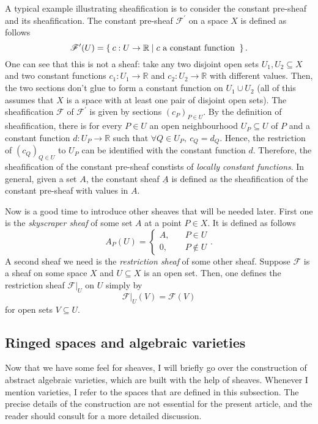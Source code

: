 A typical example illustrating sheafification is to consider the constant
pre-sheaf and its sheafification. The constant pre-sheaf
$\mathscr{F}^{\prime}$ on a space $X$ is defined as follows
\[
  \mathscr{F}^{\prime}(U) =\Set{c: U\to\mathbb{R}\mid c
    \text{ a constant function }}.
\]
One can see that this is not a sheaf: take any two disjoint open sets
$U_{1}, U_{2}\subseteq X$ and two constant functions $c_{1}:U_{1}\to
\mathbb{R}$ and $c_{2}:U_{2}\to\mathbb{R}$ with different values.
Then, the two sections don't glue to form a constant function on
$U_{1}\cup U_{2}$ (all of this assumes that $X$ is a space with
at least one pair of disjoint open sets). The sheafification $\mathscr{F}$ of
$\mathscr{F}^{\prime}$ is given by sections $(c_{P})_{P\in U}$. By the
definition of sheafification, there is for every $P\in U$ an open
neighbourhood $U_{P}\subseteq U$ of $P$ and a constant function
$d: U_{P}\to\mathbb{R}$ such that $\forall Q\in U_{P},\ c_{Q}=d_{Q}$.
Hence, the restriction of $(c_{Q})_{Q\in U}$ to $U_{P}$ can be identified
with the constant function $d$. Therefore, the sheafification of the constant
pre-sheaf constists of \emph{locally constant functions}. In general, given
a set $A$, the constant sheaf $\underline{A}$ is defined as the sheafification
of the constant pre-sheaf with values in $A$.

Now is a good time to introduce other sheaves that will be needed later.
First one is the \emph{skyscraper sheaf} of some set $A$ at a point $P\in X$.
It is defined as follows
\[
  A_{P}(U)=\begin{cases}
    A, & \quad P\in U \\
    0, & \quad P\not\in U
  \end{cases}.
\]
A second sheaf we need is the \emph{restriction sheaf} of some other sheaf.
Suppose $\mathscr{F}$ is a sheaf on some space $X$ and $U\subseteq X$ is
an open set. Then, one defines the restriction sheaf $\mathscr{F}\vert_{U}$
on $U$ simply by
\[
  \mathscr{F}\vert_{U}(V)=\mathscr{F}(V)
\]
for open sets $V\subseteq U$.

\subsection{Ringed spaces and algebraic varieties}
Now that we have some feel for sheaves, I will briefly go over the
construction of abstract algebraic varieties, which are built with the help
of sheaves. Whenever I mention varieties, I refer to the spaces that are
defined in this subsection. The precise details of the construction are not
essential for the present article, and the reader should consult
\cite{gathmann} for a more detailed discussion.

